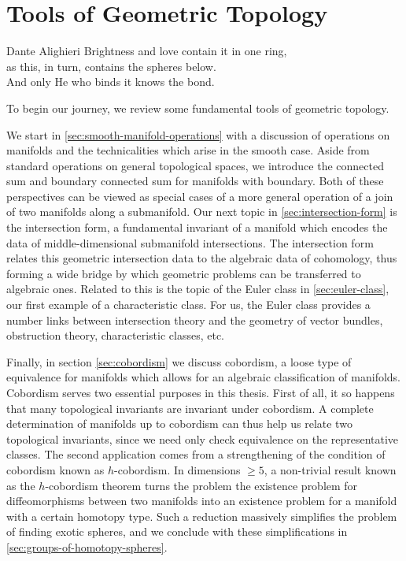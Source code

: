 \chapter{Tools of Geometric Topology}\label{chap:fundamentals}

\begin{epigraph}{19em}{Dante Alighieri}
Brightness and love contain it in one ring,\\
as this, in turn, contains the spheres below.\\
And only He who binds it knows the bond.
\end{epigraph}

\noindent
To begin our journey, we review some fundamental tools of geometric topology.

We start in \cref{sec:smooth-manifold-operations} with a discussion of operations on manifolds and the technicalities which arise in the smooth case. Aside from standard operations on general topological spaces, we introduce the connected sum and boundary connected sum for manifolds with boundary. Both of these perspectives can be viewed as special cases of a more general operation of a join of two manifolds along a submanifold. Our next topic in \cref{sec:intersection-form} is the intersection form, a fundamental invariant of a manifold which encodes the data of middle-dimensional submanifold intersections. The intersection form relates this geometric intersection data to the algebraic data of cohomology, thus forming a wide bridge by which geometric problems can be transferred to algebraic ones. Related to this is the topic of the Euler class in \cref{sec:euler-class}, our first example of a characteristic class. For us, the Euler class provides a number links between intersection theory and the geometry of vector bundles, obstruction theory, characteristic classes, etc.

Finally, in section \cref{sec:cobordism} we discuss cobordism, a loose type of equivalence for manifolds which allows for an algebraic classification of manifolds. Cobordism serves two essential purposes in this thesis. 
First of all, it so happens that many topological invariants are invariant under cobordism. A complete determination of manifolds up to cobordism can thus help us relate two topological invariants, since we need only check equivalence on the representative classes. The second application comes from a strengthening of the condition of cobordism known as $h$-cobordism. 
In dimensions $\geq 5$, a non-trivial result known as the $h$-cobordism theorem turns the problem the existence problem for diffeomorphisms between two manifolds into an existence problem for a manifold with a certain homotopy type.
Such a reduction massively simplifies the problem of finding exotic spheres, and we conclude with these simplifications in \cref{sec:groups-of-homotopy-spheres}.







